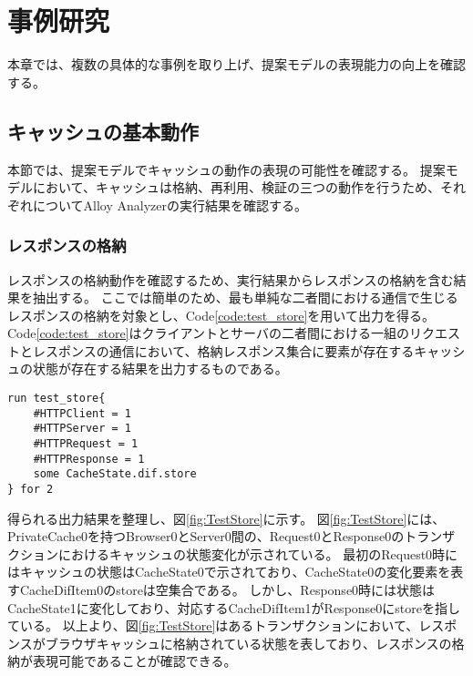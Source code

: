 \documentclass[journal]{IEEEtran}
\begin{document}
\section{事例研究}
本章では、複数の具体的な事例を取り上げ、提案モデルの表現能力の向上を確認する。

\subsection{キャッシュの基本動作}
本節では、提案モデルでキャッシュの動作の表現の可能性を確認する。
提案モデルにおいて、キャッシュは格納、再利用、検証の三つの動作を行うため、それぞれについてAlloy Analyzerの実行結果を確認する。

\subsubsection{レスポンスの格納}
レスポンスの格納動作を確認するため、実行結果からレスポンスの格納を含む結果を抽出する。
ここでは簡単のため、最も単純な二者間における通信で生じるレスポンスの格納を対象とし、Code\ref{code:test_store}を用いて出力を得る。
Code\ref{code:test_store}はクライアントとサーバの二者間における一組のリクエストとレスポンスの通信において、格納レスポンス集合に要素が存在するキャッシュの状態が存在する結果を出力するものである。

\begin{lstlisting}[caption=レスポンスの格納, label=code:test_store]
run test_store{
	#HTTPClient = 1
	#HTTPServer = 1
	#HTTPRequest = 1
	#HTTPResponse = 1
	some CacheState.dif.store
} for 2
\end{lstlisting}

得られる出力結果を整理し、図\ref{fig:TestStore}に示す。
図\ref{fig:TestStore}には、PrivateCache0を持つBrowser0とServer0間の、Request0とResponse0のトランザクションにおけるキャッシュの状態変化が示されている。
最初のRequest0時にはキャッシュの状態はCacheState0で示されており、CacheState0の変化要素を表すCacheDifItem0のstoreは空集合である。
しかし、Response0時には状態はCacheState1に変化しており、対応するCacheDifItem1がResponse0にstoreを指している。
以上より、図\ref{fig:TestStore}はあるトランザクションにおいて、レスポンスがブラウザキャッシュに格納されている状態を表しており、レスポンスの格納が表現可能であることが確認できる。

\end{document}
